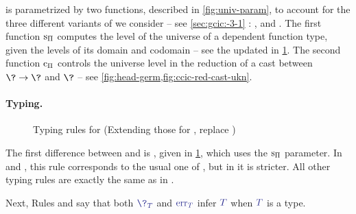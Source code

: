  is parametrized by two functions,
described in \cref{fig:univ-param}, to account for the three
different variants of  we consider – see \cref{sec:gcic:-3-1} : ,
 and .
%
The first function $\mathop{\mathrm{s}_\Pi}$ computes the level of the universe
of a dependent function type,
given the levels of its domain and codomain – see the updated 
 in \cref{fig:ccic-ty}. The second function
$\mathop{\mathrm{c}_\Pi}$ controls the universe level in the reduction of a cast between
$\? \rightarrow \?$ and $\?$ – see \cref{fig:head-germ,fig:ccic-red-cast-ukn}.

\paragraph{Typing.}

\begin{figure}
  \caption{Typing rules for  (Extending those for ,
  replace )}
  \label{fig:ccic-ty}
\end{figure}
The first difference between  and  is ,
given in \cref{fig:ccic-ty}, which uses the $\mathop{\mathrm{s}_\Pi}$ parameter. In  and
, this rule corresponds to the usual one of , but in  it is stricter.
All other typing rules are exactly the same as in .

Next, Rules  and 
say that both $\tcol{\?_T}$ and $\tcol{\err_T}$ infer $\tcol{T}$
when $\tcol{T}$ is a type.
%

